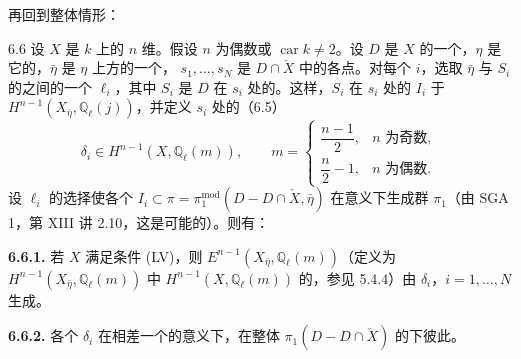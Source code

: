再回到整体情形：

\begin{SGAresult}{}{6.6}
设 $X$ 是 $k$ 上的 $n$ 维。假设 $n$ 为偶数或 $\operatorname{car}k\neq2$。设 $D$ 是 $X$ 的一个，$\eta$ 是它的，$\bar\eta$ 是 $\eta$ 上方的一个，
$s_1,\ldots,s_N$ 是 $D\cap\check X$ 中的各点。对每个 $i$，选取 $\bar\eta$ 与 $S_i$ 的之间的一个 $\ell_i$，其中 $S_i$ 是 $D$ 在 $s_i$ 处的。这样，$S_i$ 在 $s_i$ 处的 $I_i$ 于 $H^{n-1}(X_{\bar\eta},\mathbb Q_\ell(j))$，并定义 $s_i$ 处的（6.5）
\[
\delta_i\in H^{n-1}(X,\mathbb Q_\ell(m)),\qquad
m=\begin{cases}
\dfrac{n-1}{2},&n\text{ 为奇数},\\[4pt]
\dfrac n2-1,&n\text{ 为偶数}.
\end{cases}
\]
设 $\ell_i$ 的选择使各个 $I_i\subset\pi=\pi_1^{\mathrm{mod}}(D-D\cap\check X,\bar\eta)$ 在意义下生成群 $\pi_1$（由 SGA 1，第 XIII 讲 2.10，这是可能的）。则有：

\textbf{6.6.1.} 若 $X$ 满足条件 (LV)，则 $E^{n-1}(X_{\bar\eta},\mathbb Q_\ell(m))$（定义为 $H^{n-1}(X_{\bar\eta},\mathbb Q_\ell(m))$ 中 $H^{n-1}(X,\mathbb Q_\ell(m))$ 的，参见 5.4.4）由 $\delta_i$，$i=1,\ldots,N$ 生成。

\textbf{6.6.2.} 各个 $\delta_i$ 在相差一个的意义下，在整体 $\pi_1(D-D\cap\check X)$ 的下彼此。
\end{SGAresult}
